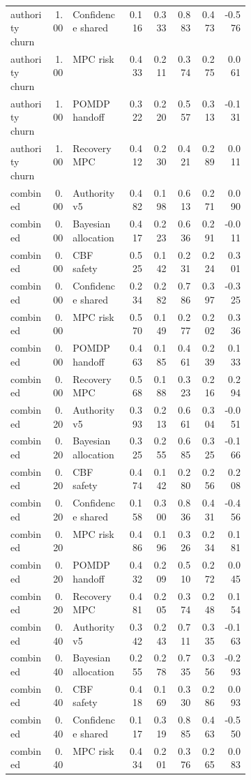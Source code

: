 \documentclass{article}
\begin{document}
\begin{center}
\begin{longtable}{p{0.17\linewidth}rp{0.23\linewidth}rrrrr}
authority churn & 1.00 & Confidence shared & 0.116 & 0.333 & 0.883 & 0.473 & -0.576\\
authority churn & 1.00 & MPC risk & 0.433 & 0.211 & 0.374 & 0.275 & 0.061\\
authority churn & 1.00 & POMDP handoff & 0.322 & 0.220 & 0.557 & 0.313 & -0.131\\
authority churn & 1.00 & Recovery MPC & 0.412 & 0.230 & 0.421 & 0.289 & 0.011\\
combined & 0.00 & Authority v5 & 0.482 & 0.198 & 0.613 & 0.271 & 0.090\\
combined & 0.00 & Bayesian allocation & 0.417 & 0.223 & 0.636 & 0.291 & -0.011\\
combined & 0.00 & CBF safety & 0.525 & 0.142 & 0.231 & 0.224 & 0.301\\
combined & 0.00 & Confidence shared & 0.234 & 0.282 & 0.786 & 0.397 & -0.325\\
combined & 0.00 & MPC risk & 0.570 & 0.149 & 0.277 & 0.202 & 0.336\\
combined & 0.00 & POMDP handoff & 0.463 & 0.185 & 0.461 & 0.239 & 0.133\\
combined & 0.00 & Recovery MPC & 0.568 & 0.188 & 0.323 & 0.216 & 0.294\\
combined & 0.20 & Authority v5 & 0.393 & 0.213 & 0.661 & 0.304 & -0.051\\
combined & 0.20 & Bayesian allocation & 0.325 & 0.255 & 0.685 & 0.325 & -0.166\\
combined & 0.20 & CBF safety & 0.474 & 0.142 & 0.280 & 0.256 & 0.208\\
combined & 0.20 & Confidence shared & 0.158 & 0.300 & 0.836 & 0.431 & -0.456\\
combined & 0.20 & MPC risk & 0.486 & 0.196 & 0.326 & 0.234 & 0.181\\
combined & 0.20 & POMDP handoff & 0.432 & 0.209 & 0.510 & 0.272 & 0.045\\
combined & 0.20 & Recovery MPC & 0.481 & 0.205 & 0.374 & 0.248 & 0.154\\
combined & 0.40 & Authority v5 & 0.342 & 0.243 & 0.711 & 0.335 & -0.163\\
combined & 0.40 & Bayesian allocation & 0.255 & 0.278 & 0.735 & 0.356 & -0.293\\
combined & 0.40 & CBF safety & 0.418 & 0.169 & 0.330 & 0.286 & 0.093\\
combined & 0.40 & Confidence shared & 0.117 & 0.319 & 0.885 & 0.463 & -0.550\\
combined & 0.40 & MPC risk & 0.434 & 0.201 & 0.376 & 0.265 & 0.083\\

\end{longtable}
\end{center}
\end{document}
